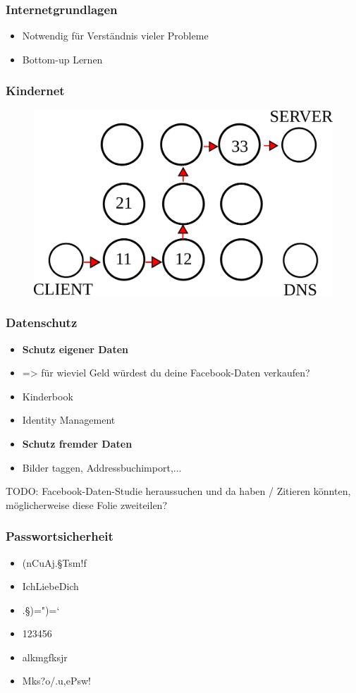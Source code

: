\documentclass[12pt]{beamer}
\begin{document}
\begin{frame}
  \frametitle{Internetgrundlagen}
  \begin{itemize}
    \item Notwendig für Verständnis vieler Probleme
    \item Bottom-up Lernen
  \end{itemize}
\end{frame}

\begin{frame}
  \frametitle{Kindernet}
  \begin{figure}
    \includegraphics[height=0.7\textheight]{img/kindernet.png}
  \end{figure}
\end{frame}

\begin{frame}
  \frametitle{Datenschutz}
  \begin{itemize}
    \item \textbf{Schutz eigener Daten}
    \item => für wieviel Geld würdest du deine Facebook-Daten verkaufen?
    \item Kinderbook
    \item Identity Management
    \item \textbf{Schutz fremder Daten}
    \item Bilder taggen, Addressbuchimport,...
  \end{itemize}
  TODO: Facebook-Daten-Studie heraussuchen und da haben / Zitieren könnten, möglicherweise diese Folie zweiteilen?
\end{frame}

\begin{frame}
  \frametitle{Passwortsicherheit}
  \begin{itemize}
    \item (nCuAj.§Tsm!f
    \item IchLiebeDich
    \item .§)=")=`
    \item 123456
    \item alkmgfksjr
    \item Mks?o/.u,ePsw!
  \end{itemize}
\end{frame}
\end{document}
